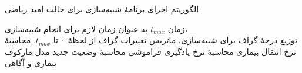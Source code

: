 \documentclass[xcolor=dvipsnames, professionalfonts, aspectratio=169, 11pt]{beamer}
\begin{document}
\begin{frame}[noframenumbering]
    \frametitle{}

    \small
    \begin{algorithm}[H]
        \caption{الگوریتم اجرای برنامهٔ شبیه‌سازی برای حالت امید ریاضی}
        \label{alg:simulation-expectation}
        \begin{algorithmic}[1]
            \REQUIRE زمان $t_{max}$ به عنوان زمان لازم برای انجام شبیه‌سازی،\\
            \REQUIRE توزیع درجهٔ گراف برای شبیه‌سازی،
            \ENSURE ماتریس تغییرات گراف از لحظهٔ ۰ تا $t_{max}$.
            \STATE محاسبهٔ نرخ انتقال بیماری
            \STATE محاسبهٔ نرخ یادگیری-فراموشی
            \STATE محاسبهٔ وضعیت جدید مدل مارکوف بیماری و آگاهی
            \ENDFOR
        \end{algorithmic}
    \end{algorithm}

\end{frame}
\end{document}
